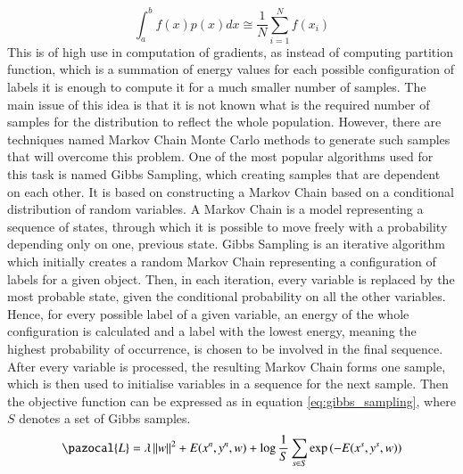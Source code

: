 \begin{equation}
    \int_{a}^{b}{f(x)p(x)dx} \cong \frac{1}{N}\sum_{i=1}^{N}{f(x_i)}
\end{equation}
This is of high use in computation of gradients, as instead of computing partition function, which is a summation of energy values for each possible configuration of labels it is enough to compute it for a much smaller number of samples. The main issue of this idea is that it is not known what is the required number of samples for the distribution to reflect the whole population. However, there are techniques named Markov Chain Monte Carlo methods to generate such samples that will overcome this problem. One of the most popular algorithms used for this task is named Gibbs Sampling, which creating samples that are dependent on each other. It is based on constructing a Markov Chain based on a conditional distribution of random variables. A Markov Chain is a model representing a sequence of states, through which it is possible to move freely with a probability depending only on one, previous state. Gibbs Sampling is an iterative algorithm which initially creates a random Markov Chain representing a configuration of labels for a given object. Then, in each iteration, every variable is replaced by the most probable state, given the conditional probability on all the other variables. Hence, for every possible label of a given variable, an energy of the whole configuration is calculated and a label with the lowest energy, meaning the highest probability of occurrence, is chosen to be involved in the final sequence. After every variable is processed, the resulting Markov Chain forms one sample, which is then used to initialise variables in a sequence for the next sample.  Then the objective function can be expressed as in equation \ref{eq:gibbs_sampling}, where $S$ denotes a set of Gibbs samples.
\begin{equation}
    \label{eq:gibbs_sampling}
    \pazocal{L} = \lambda \left \| w \right \|^2 + E(x^n,y^n,w) + \log{\frac{1}{S}\sum_{s \in S}{\exp{(-E(x^s,y^s,w))}}}
\end{equation}
